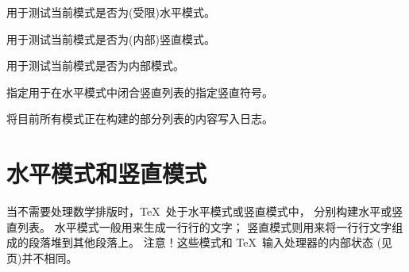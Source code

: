 \documentclass{book}
\begin{document}
\label{cschap:vadjust}\label{cschap:showlists}
\begin{inventory}
\item [\cs{ifhmode}] 
      用于测试当前模式是否为(受限)水平模式。

\item [\cs{ifvmode}] 
      用于测试当前模式是否为(内部)竖直模式。

\item [\cs{ifinner}] 
      用于测试当前模式是否为内部模式。

\item [\cs{vadjust}] 
      指定用于在水平模式中闭合竖直列表的指定竖直符号。

\item [\cs{showlists}] 
      将目前所有模式正在构建的部分列表的内容写入日志。
\end{inventory}

\section{水平模式和竖直模式}

当不需要处理数学排版时，\TeX\ 处于水平模式或竖直模式中，
分别构建水平或竖直列表。
水平模式一般用来生成一行行的文字；
竖直模式则用来将一行行文字组成的段落堆到其他段落上。
注意！这些模式和 \TeX\ 输入处理器的内部状态
(见 \pageref{input:states} 页)并不相同。
\end{document}
